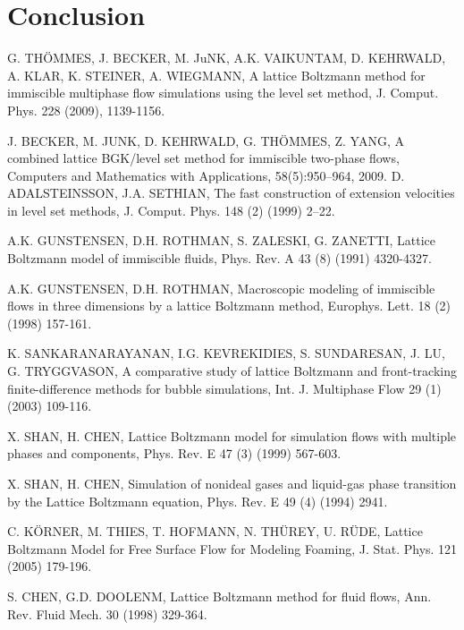 \documentclass[final,leqno,onefignum,onetabnum]{siamltexmm}
\begin{document}

\section{Conclusion}

\begin{thebibliography}{1}	

 {\sc G. TH\"OMMES, J. BECKER, M. JuNK, A.K. VAIKUNTAM, D. KEHRWALD, A. KLAR, K. STEINER, A. WIEGMANN}, A lattice Boltzmann method for immiscible multiphase flow simulations using the level set method, J. Comput. Phys. 228 (2009), 1139-1156.

 {\sc J. BECKER, M. JUNK, D. KEHRWALD, G. TH\"OMMES, Z. YANG}, A combined lattice BGK/level set method for immiscible two-phase flows, Computers and Mathematics with Applications, 58(5):950–964, 2009.
 {\sc D. ADALSTEINSSON, J.A. SETHIAN}, The fast construction of extension velocities in level set methods, J. Comput. Phys. 148 (2) (1999) 2–22.

 {\sc A.K. GUNSTENSEN, D.H. ROTHMAN, S. ZALESKI, G. ZANETTI}, Lattice Boltzmann model of immiscible fluids, Phys. Rev. A 43 (8) (1991) 4320-4327.

 {\sc A.K. GUNSTENSEN, D.H. ROTHMAN}, Macroscopic modeling of immiscible flows in three dimensions by a lattice Boltzmann method, Europhys. Lett. 18 (2) (1998) 157-161.
	
 {\sc K. SANKARANARAYANAN, I.G. KEVREKIDIES, S. SUNDARESAN, J. LU, G. TRYGGVASON}, A comparative study of lattice Boltzmann and front-tracking finite-difference methods for bubble simulations, Int. J. Multiphase Flow 29 (1) (2003) 109-116.

 {\sc X. SHAN, H. CHEN}, Lattice Boltzmann model for simulation flows with multiple phases and components, Phys. Rev. E 47 (3) (1999) 567-603.

 {\sc X. SHAN, H. CHEN}, Simulation of nonideal gases and liquid-gas phase transition by the Lattice Boltzmann equation, Phys. Rev. E 49 (4) (1994) 2941.
	
 {\sc C. K\"ORNER, M. THIES, T. HOFMANN, N. TH\"UREY, U. R\"UDE}, Lattice Boltzmann Model for Free Surface Flow for Modeling Foaming, J. Stat. Phys. 121 (2005) 179-196.

 {\sc S. CHEN, G.D. DOOLENM}, Lattice Boltzmann method for fluid flows, Ann. Rev. Fluid Mech. 30 (1998) 329-364.


\end{thebibliography}
\end{document}
